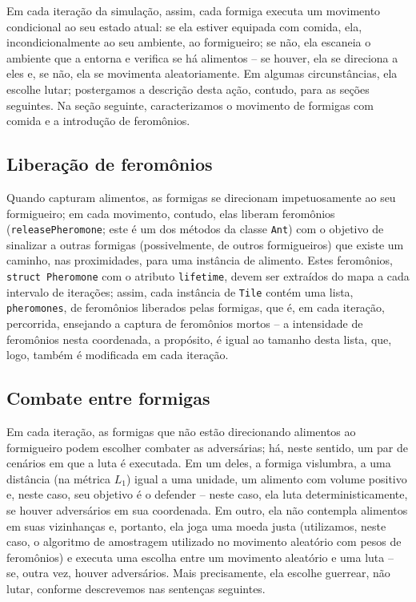 \documentclass[12pt]{article}
\theoremstyle{definition}
\begin{document}
Em cada iteração da simulação, assim, cada formiga executa um movimento condicional ao seu estado atual: se ela estiver equipada com comida, ela, incondicionalmente ao seu ambiente, ao formigueiro; se não, ela escaneia o ambiente que a entorna e verifica se há alimentos -- se houver, ela se direciona a eles e, se não, ela se movimenta aleatoriamente. Em algumas circunstâncias, ela escolhe lutar; postergamos a descrição desta ação, contudo, para as seções seguintes. Na seção seguinte, caracterizamos o movimento de formigas com comida e a introdução de feromônios. 

\subsection{Liberação de feromônios} 

Quando capturam alimentos, as formigas se direcionam impetuosamente ao seu formigueiro; em cada movimento, contudo, elas liberam feromônios (\texttt{releasePheromone}; este é um dos métodos da classe \texttt{Ant}) com o objetivo de sinalizar a outras formigas (possivelmente, de outros formigueiros) que existe um caminho, nas proximidades, para uma instância de alimento. Estes feromônios, \texttt{struct Pheromone} com o atributo \texttt{lifetime}, devem ser extraídos do mapa a cada intervalo de iterações; assim, cada instância de \texttt{Tile} contém uma lista, \texttt{pheromones}, de feromônios liberados pelas formigas, que é, em cada iteração, percorrida, ensejando a captura de feromônios mortos -- a intensidade de feromônios nesta coordenada, a propósito, é igual ao tamanho desta lista, que, logo, também é modificada em cada iteração. 

\subsection{Combate entre formigas} 

Em cada iteração, as formigas que não estão direcionando alimentos ao formigueiro podem escolher combater as adversárias; há, neste sentido, um par de cenários em que a luta é executada. Em um deles, a formiga vislumbra, a uma distância (na métrica $L_{1}$) igual a uma unidade, um alimento com volume positivo e, neste caso, seu objetivo é o defender -- neste caso, ela luta deterministicamente, se houver adversários em sua coordenada. Em outro, ela não contempla alimentos em suas vizinhanças e, portanto, ela joga uma moeda justa (utilizamos, neste caso, o algoritmo de amostragem utilizado no movimento aleatório com pesos de feromônios) e executa uma escolha entre um movimento aleatório e uma luta -- se, outra vez, houver adversários. Mais precisamente, ela escolhe guerrear, não lutar, conforme descrevemos nas sentenças seguintes. 
\end{document}
